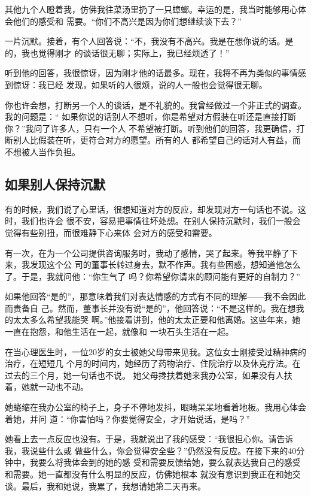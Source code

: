 \documentclass{ctexart}
\begin{document}
其他九个人瞪着我，仿佛我往菜汤里扔了一只蟑螂。幸运的是，我当时能够用心体会他们的感受和
需要。``你们不高兴是因为你们想继续谈下去？''

一片沉默。接着，有个人回答说：``不，我没有不高兴。我是在想你说的话。是的，我也觉得刚才
的谈话很无聊；实际上，我已经烦透了！''

听到他的回答，我很惊讶，因为刚才他的话最多。现在，我将不再为类似的事情感到惊讶：我已经
发现，如果听的人很烦，说的人一般也会觉得很无聊。

你也许会想，打断另一个人的谈话，是不礼貌的。我曾经做过一个非正式的调查。我的问题是：``
如果你说的话别人不想听，你是希望对方假装在听还是直接打断你？''我问了许多人，只有一个人
不希望被打断。听到他们的回答，我更确信，打断别人比假装在听，更符合对方的愿望。所有的人
都希望自己的话对人有益，而不想被人当作负担。


\subsection{如果别人保持沉默}

有的时候，我们说了心里话，很想知道对方的反应，却发现对方一句话也不说。这时，我们也许会
很不安，容易把事情往坏处想。在别人保持沉默时，我们一般会觉得有些别扭，而很难静下心来体
会对方的感受和需要。

有一次，在为一个公司提供咨询服务时，我动了感情，哭了起来。等我平静了下来，我发现这个公
司的董事长转过身去，默不作声。我有些困惑，想知道他怎么了。于是，我就问他：``你生气了
吗？你希望你请来的顾问能有更好的自制力？''

如果他回答``是的''，那意味着我们对表达情感的方式有不同的理解------我不会因此而责备自
己。然而，董事长并没有说``是的''，他回答说：``不是这样的。我在想我的太太多么希望我能哭
啊。''他接着讲到，他的太太正要和他离婚。这些年来，她一直在抱怨，和他生活在一起，就像和
一块石头生活在一起。

在当心理医生时，一位20岁的女士被她父母带来见我。这位女士刚接受过精神病的治疗，在短短几
个月的时间内，她经历了药物治疗、住院治疗以及休克疗法。在过去的三个月，她一句话也不说。
她父母搀扶着她来我办公室，如果没有人扶着，她就一动也不动。

她蜷缩在我办公室的椅子上，身子不停地发抖，眼睛呆呆地看着地板。我用心体会着她，并问
道：``你害怕吗？你要觉得安全，才开始说话，是吗？''

她看上去一点反应也没有。于是，我就说出了我的感受：``我很担心你。请告诉我，我说些什么或
做些什么，你会觉得安全些？''仍然没有反应。在接下来的40分钟中，我要么将我体会到的她的感
受和需要反馈给她，要么就表达我自己的感受和需要。她一直都没有什么明显的反应，仿佛她根本
就没有意识到我正在和她交谈。最后，我和她说，我累了，我想请她第二天再来。
\end{document}
